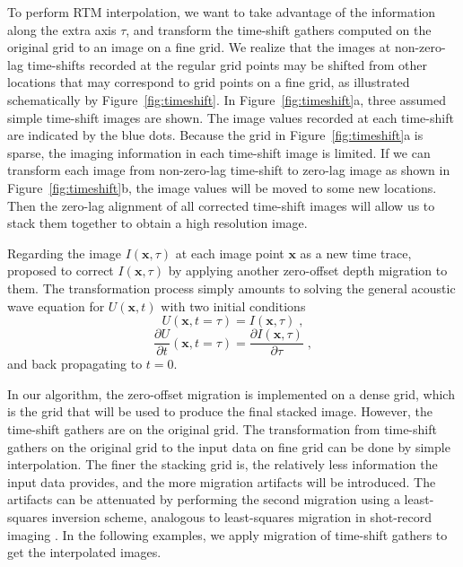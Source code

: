 To perform RTM interpolation, we want to take advantage of the information along the extra axis $\tau$, 
and transform the time-shift gathers computed on the original grid to an image on a fine grid.
We realize that the images at non-zero-lag time-shifts recorded at the regular grid points
may be shifted from other locations that may correspond to grid points on a fine grid, as illustrated schematically by Figure~\ref{fig:timeshift}.
In Figure~\ref{fig:timeshift}a, three assumed simple time-shift images are shown. 
The image values recorded at each time-shift are indicated by the blue dots.
Because the grid in Figure~\ref{fig:timeshift}a is sparse, the imaging information in each time-shift image is limited.
If we can transform each image from non-zero-lag time-shift to zero-lag 
image as shown in Figure~\ref{fig:timeshift}b, 
the image values will be moved to some new locations. 
Then the zero-lag alignment of all corrected time-shift images will allow us to stack them together to obtain a high resolution image.


Regarding the image $I(\mathbf{x},\tau)$ at each image point $\mathbf{x}$ as a new time trace, \cite{xu14} proposed to correct $I(\mathbf{x},\tau)$ 
by applying another zero-offset depth migration to them.
The transformation process simply amounts to solving the general acoustic wave equation for $U(\mathbf{x},t)$
with two initial conditions
\begin{equation}
U(\mathbf{x},t=\tau)=I(\mathbf{x},\tau) \; ,
\label{eq:condition1}
\end{equation}
\begin{equation}
\frac{\partial U}{\partial t}(\mathbf{x} , t=\tau)= \frac{\partial I(\mathbf{x},\tau)}{\partial \tau} \; ,
\label{eq:condition2}
\end{equation}
and back propagating to $t=0$.

In our algorithm, the zero-offset migration is implemented on a dense grid, 
which is the grid that will be used to produce the final stacked image.
However, the time-shift gathers are on the original grid.
The transformation from time-shift gathers on the original grid to the input data on fine grid can be done by simple interpolation.
The finer the stacking grid is, the relatively less information the input data provides, 
and the more migration artifacts will be introduced. 
The artifacts can be attenuated by performing the second migration using a least-squares inversion scheme,
analogous to least-squares migration in shot-record imaging
\cite[]{xue14}.
In the following examples, we apply migration of time-shift gathers to get the interpolated images.

